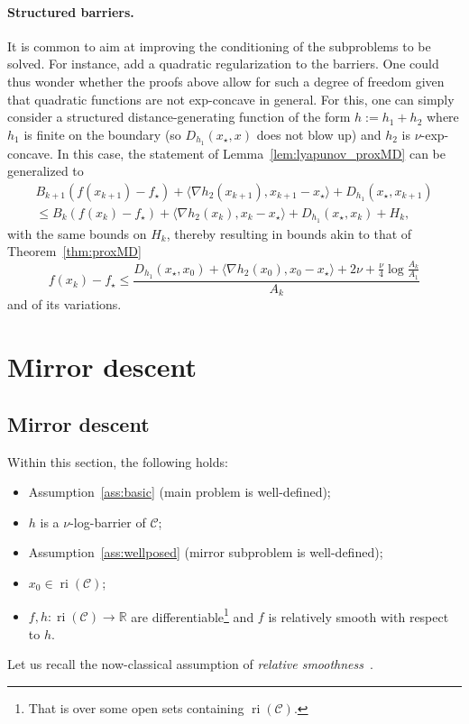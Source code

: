 \documentclass[a4paper]{article}
\renewcommand{\leq}{\leqslant}
\newcommand{\CC}{\mathcal{C}}
\newcommand{\coloneqq}{:=}
\newcommand{\R}{\mathbb{R}}
\newcommand{\ip}[2]{\langle #1, #2\rangle}
\DeclareMathOperator{\ri}{ri}
\begin{document}
\paragraph{Structured barriers.}
It is common to aim at improving the conditioning of the subproblems to be solved.
For instance, \cite{doljansky1998interior,cipolla2023proximal} add a quadratic regularization to the barriers.
One could thus wonder whether the proofs above allow for such a degree of freedom given that quadratic functions are not exp-concave in general.
For this, one can simply consider a structured distance-generating function of the form $h\coloneqq h_1+h_2$ where $h_1$ is finite on the boundary (so $D_{h_1}(x_\star,x)$ does not blow up) and $h_2$ is $\nu$-exp-concave.
In this case, the statement of Lemma~\ref{lem:lyapunov_proxMD} can be generalized to
\begin{multline*}
   B_{k+1} \left(f(x_{k+1})-f_\star\right) + \ip{\nabla h_2(x_{k+1})}{ x_{k+1}-x_\star}+ D_{h_1}(x_\star,x_{k+1})\\
   \leq  B_k\left(f(x_{k})-f_\star\right) + \ip{\nabla h_2(x_{k})}{ x_{k}-x_\star}+ D_{h_1}(x_\star,x_k)+H_k,
\end{multline*}
with the same bounds on $H_k$, thereby resulting in bounds akin to that of Theorem~\ref{thm:proxMD}
\begin{equation*}
        f(x_k)-f_\star\leq \frac{D_{h_1}(x_\star,x_0)+ \ip{\nabla h_2(x_{0})}{ x_{0}-x_\star} + 2\nu + \frac \nu 4\log\frac{A_k}{A_1}}{A_k}
\end{equation*}
and of its variations.


\section{Mirror descent}\label{sec:mirror_algorithms}

\subsection{Mirror descent}\label{sec:md}

Within this section, the following holds:
\begin{itemize}
        \item Assumption~\ref{ass:basic} (main problem is well-defined);
        \item $h$ is a $\nu$-log-barrier of $\CC$;
        \item Assumption~\ref{ass:wellposed} (mirror subproblem is well-defined);
        \item $x_0\in \ri(\CC)$;
        \item $f,h\colon \ri(\CC)\to \R$ are  differentiable\footnote{That is over some open sets containing $\ri(\CC)$.} and $f$ is relatively smooth with respect to $h$. 
\end{itemize}
Let us recall the now-classical assumption of \emph{relative smoothness}~\cite{bauschke2017,lu2017,birnbaum2011distributed}.
\end{document}
